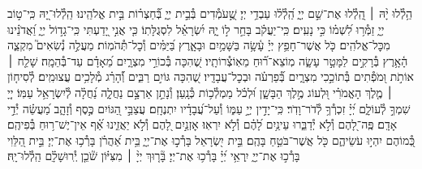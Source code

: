 \documentclass[twoside, openany, parskip=half, 11pt]{book}
\begin{document}
\begin{narrow}
הַ֥לְ֯לוּ יָ֨הּ ׀
הַֽ֭לְ֯לוּ אֶת־שֵׁ֣ם יְיָ֑ הַֽ֝לְ֯ל֗וּ עַבְדֵ֥י יְיָ׃
שֶׁ֣֭עֹמְ֯דִים בְּ֯בֵ֣ית יְיָ֑ בְּ֯֝חַצְר֗וֹת בֵּ֣ית אֱלֹהֵֽינוּ׃
הַֽלְ֯לוּ־יָ֭הּ כִּֽי־ט֣וֹב יְיָ֑ זַמְּ֯ר֥וּ לִ֝שְׁמ֗וֹ כִּ֣י נָעִֽים׃
כִּֽי־יַעֲקֹ֗ב בָּחַ֣ר ל֣וֹ יָ֑הּ יִ֝שְׂרָאֵ֗ל לִסְגֻלָּתֽוֹ׃
כִּ֤י אֲנִ֣י יָ֭דַעְתִּי כִּֽי־גָד֣וֹל יְיָ֑ וַ֝אֲדֹנֵ֗ינוּ מִכׇּל־אֱלֹהִֽים׃
כֹּ֤ל אֲשֶׁר־חָפֵ֥ץ יְיָ֗ עָ֫שָׂ֥ה בַּשָּׁמַ֥יִם וּבָאָ֑רֶץ בַּ֝יַּמִּ֗ים וְ֯כׇל־תְּ֯הֹמֽוֹת׃
מַעֲלֶ֣ה נְ֯שִׂאִים֮ מִקְצֵ֢ה הָ֫אָ֥רֶץ בְּ֯רָקִ֣ים לַמָּטָ֣ר עָשָׂ֑ה מֽוֹצֵא־ר֗֝וּחַ מֵאֽוֹצְ֯רוֹתָֽיו׃
שֶׁ֭הִכָּה בְּ֯כוֹרֵ֣י מִצְרָ֑יִם מֵ֝אָדָ֗ם עַד־בְּ֯הֵמָֽה׃
שָׁלַ֤ח ׀ אוֹתֹ֣ת וּ֭מֹפְ֯תִים בְּ֯תוֹכֵ֣כִי מִצְרָ֑יִם בְּ֯֝פַרְעֹ֗ה וּבְכׇל־עֲבָדָֽיו׃
שֶׁ֭הִכָּה גּוֹיִ֣ם רַבִּ֑ים וְ֯֝הָרַ֗ג מְ֯לָכִ֥ים עֲצוּמִֽים׃
לְ֯סִיח֤וֹן ׀ מֶ֤לֶךְ הָאֱמֹרִ֗י וּ֭לְעוֹג מֶ֣לֶךְ הַבָּשָׁ֑ן וּ֝לְכֹ֗ל מַמְלְ֯כ֥וֹת כְּ֯נָֽעַן׃
וְ֯נָתַ֣ן אַרְצָ֣ם נַחֲלָ֑ה נַ֝חֲלָ֗ה לְ֯יִשְׂרָאֵ֥ל עַמּֽוֹ׃
יְיָ֭ שִׁמְךָ֣ לְ֯עוֹלָ֑ם יְ֝יָ֗ זִכְרְ֯ךָ֥ לְ֯דֹר־וָדֹֽר׃
כִּֽי־יָדִ֣ין יְיָ֣ עַמּ֑וֹ וְ֯עַל־עֲ֝בָדָ֗יו יִתְנֶחָֽם׃
עֲצַבֵּ֣י הַ֭גּוֹיִם כֶּ֣סֶף וְ֯זָהָ֑ב מַ֝עֲשֵׂ֗ה יְ֯דֵ֣י אָדָֽם׃
פֶּֽה־לָ֭הֶם וְ֯לֹ֣א יְ֯דַבֵּ֑רוּ עֵינַ֥יִם לָ֝הֶ֗ם וְ֯לֹ֣א יִרְאֽוּ׃
אׇזְנַ֣יִם לָ֭הֶם וְ֯לֹ֣א יַאֲזִ֑ינוּ אַ֗֝ף אֵין־יֶשׁ־ר֥וּחַ בְּ֯פִיהֶֽם׃
כְּ֭֯מוֹהֶם יִהְי֣וּ עֹשֵׂיהֶ֑ם כֹּ֖ל אֲשֶׁר־בֹּטֵ֣חַ בָּהֶֽם׃
בֵּ֣ית יִ֭שְׂרָאֵל בָּרְ֯כ֣וּ אֶת־יְיָ֑ בֵּ֥ית אַ֝הֲרֹ֗ן בָּרְ֯כ֥וּ אֶת־יְיָ׃
בֵּ֣ית הַ֭לֵּוִי בָּרְ֯כ֣וּ אֶת־יְיָ֑ יִֽרְאֵ֥י יְ֝יָ֗ בָּרְ֯כ֥וּ אֶת־יְיָ׃
בָּ֘ר֤וּךְ יְיָ֨ ׀ מִצִּיּ֗וֹן שֹׁ֘כֵ֤ן יְֽ֯רוּשָׁלָ֗‍ִם הַֽלְ֯לוּ־יָֽהּ׃




\end{narrow}
\end{document}
